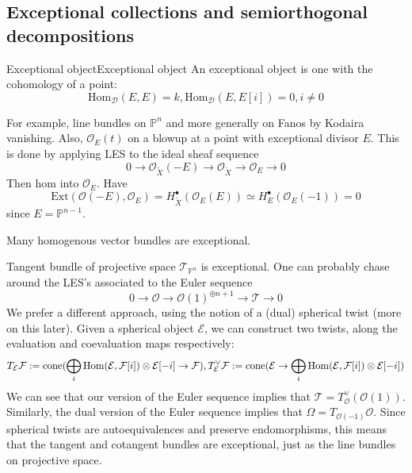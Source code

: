 
\subsection{Exceptional collections and semiorthogonal decompositions}

\begin{definition}{Exceptional object}{Exceptional object}
    An exceptional object is one with the cohomology of a point: $$\mathrm{Hom}_{\mathcal{D}}(E,E)=k, \mathrm{Hom}_{\mathcal{D}}(E,E[i])=0, i\neq 0$$
\end{definition}


For example, line bundles on $\mathbb{P}^n$ and more generally on Fanos by Kodaira vanishing. Also, $\mathcal{O}_{E}(t)$ on a blowup at a point with exceptional divisor $E$. This is done by applying LES to the ideal sheaf sequence $$0\xrightarrow{}\mathcal{O}_{\tilde{X}} (-E)\xrightarrow{}\mathcal{O}_{\tilde{X}}\xrightarrow{}\mathcal{O}_{E}\xrightarrow{}0$$Then hom into $\mathcal{O}_{E}$. Have $$\mathrm{Ext}(\mathcal{O}(-E), \mathcal{O}_{E})=H^\bullet_{\tilde{ X}} (\mathcal{O}_{E}(E))\simeq H^\bullet_{E} (\mathcal{O}_{E}(-1))=0$$since $E=\mathbb{P}^{n-1}$. 

Many homogenous vector bundles are exceptional.

\begin{example}{Tangent bundle of projective space}{} 
    $\mathcal{T}_{\mathbb{P}^n}$ is exceptional. One can probably chase around the LES's associated to the Euler sequence $$0\rightarrow \mathcal{O}\rightarrow \mathcal{O}(1)^{\oplus n+1}\rightarrow \mathcal{T}\rightarrow 0$$
    We prefer a different approach, using the notion of a (dual) spherical twist (more on this later). Given a spherical object $\mathcal{E}$, we can construct two twists, along the evaluation and coevaluation maps respectively: $$T_\mathcal{E}\mathcal{F}:=\mathrm{cone}(\bigoplus_i \operatorname{Hom}(\mathcal{E},\mathcal{F}[i])\otimes \mathcal{E}[-i]\rightarrow \mathcal{F}), T^\lor_\mathcal{E}\mathcal{F}:=\mathrm{cone}(\mathcal{E}\rightarrow \bigoplus_i \operatorname{Hom}(\mathcal{E},\mathcal{F}[i])\otimes \mathcal{E}[-i] )$$
    We can see that our version of the Euler sequence implies that $\mathcal{T}=T^\lor_\mathcal{O}(\mathcal{O}(1))$. Similarly, the dual version of the Euler sequence implies that $\Omega=T_{\mathcal{O}(-1)}\mathcal{O}$. Since spherical twists are autoequivalences and preserve endomorphisms, this means that the tangent and cotangent bundles are exceptional, just as the line bundles on projective space.
\end{example}

